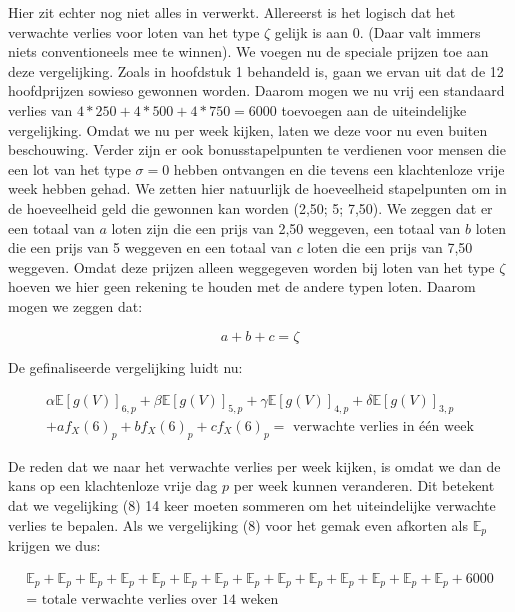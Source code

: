 \documentclass[a4paper, oneside, book]{memoir}
\begin{document}
Hier zit echter nog niet alles in verwerkt. Allereerst is het logisch dat het verwachte verlies voor loten van het type $\zeta$ gelijk is aan 0. (Daar valt immers niets conventioneels mee te winnen). We voegen nu de speciale prijzen toe aan deze vergelijking. Zoals in hoofdstuk 1 behandeld is, gaan we ervan uit dat de 12 hoofdprijzen sowieso gewonnen worden. Daarom mogen we nu vrij een standaard verlies van $4*250 + 4*500 + 4*750 = 6000$ toevoegen aan de uiteindelijke vergelijking. Omdat we nu per week kijken, laten we deze voor nu even buiten beschouwing. Verder zijn er ook bonusstapelpunten te verdienen voor mensen die een lot van het type $\sigma=0$ hebben ontvangen en die tevens een klachtenloze vrije week hebben gehad. We zetten hier natuurlijk de hoeveelheid stapelpunten om in de hoeveelheid geld die gewonnen kan worden (2,50; 5; 7,50). We zeggen dat er een totaal van $a$ loten zijn die een prijs van 2,50 weggeven, een totaal van $b$ loten die een prijs van 5 weggeven en een totaal van $c$ loten die een prijs van 7,50 weggeven. Omdat deze prijzen alleen weggegeven worden bij loten van het type $\zeta$ hoeven we hier geen rekening te houden met de andere typen loten. Daarom mogen we zeggen dat:

\begin{equation}
  a+b+c=\zeta
\end{equation}

De gefinaliseerde vergelijking luidt nu:

\begin{multline}
    \alpha\mathbb{E}[g(V)]_{6,p} + \beta\mathbb{E}[g(V)]_{5,p} + \gamma\mathbb{E}[g(V)]_{4,p} + \delta\mathbb{E}[g(V)]_{3,p}\\
        + af_{X}(6)_{p} + bf_{X}(6)_{p} + cf_{X}(6)_{p} = \mbox{ verwachte verlies in één week}
\end{multline}

De reden dat we naar het verwachte verlies per week kijken, is omdat we dan de kans op een klachtenloze vrije dag $p$ per week kunnen veranderen. Dit betekent dat we vegelijking (8) 14 keer moeten sommeren om het uiteindelijke verwachte verlies te bepalen. Als we vergelijking (8) voor het gemak even afkorten als $\mathbb{E}_{p}$ krijgen we dus:

\begin{multline}
  \mathbb{E}_{p}+\mathbb{E}_{p}+\mathbb{E}_{p}+\mathbb{E}_{p}+\mathbb{E}_{p}+\mathbb{E}_{p}+\mathbb{E}_{p}+\mathbb{E}_{p}+\mathbb{E}_{p}+\mathbb{E}_{p}+\mathbb{E}_{p}+\mathbb{E}_{p}+\mathbb{E}_{p}
  +\mathbb{E}_{p}+6000\\= \mbox{ totale verwachte verlies over 14 weken}
\end{multline}
\end{document}
